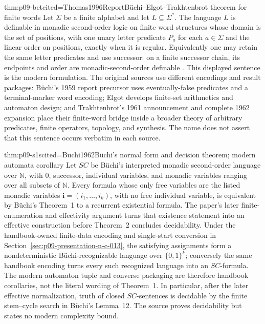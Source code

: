 \begin{hbtheorem}{thm:p09-bet}{cited=Thomas1996Report}{B\"uchi--Elgot--Trakhtenbrot theorem for finite words}
Let \(\Sigma\) be a finite alphabet and let \(L\subseteq\Sigma^*\).  The
language \(L\) is definable in monadic second-order logic on finite word
structures whose domain is the set of positions, with one unary letter
predicate \(P_a\) for each \(a\in\Sigma\) and the linear order on positions,
exactly when it is regular.  Equivalently one may retain the same letter
predicates and use successor: on a finite successor chain, its endpoints and
order are monadic-second-order definable
\cite{Buchi1959WeakReport,Buchi1960,Elgot1961,Trakhtenbrot1961,
Trakhtenbrot1962Expanded,Thomas1996Report}.
This displayed sentence is the modern formulation.  The original sources use
different encodings and result packages: B\"uchi's 1959 report
precursor uses eventually-false predicates and a terminal-marker word
encoding; Elgot develops finite-set arithmetics and automaton design; and
Trakhtenbrot's 1961 announcement and complete 1962 expansion place their
finite-word bridge inside a broader theory of arbitrary predicates, finite
operators, topology, and synthesis.  The name does not assert that this
sentence occurs verbatim in each source.
\end{hbtheorem}

\begin{hbtheorem}{thm:p09-s1s}{cited=Buchi1962}{B\"uchi's normal form and decision theorem; modern automata corollary}
Let \(SC\) be B\"uchi's interpreted monadic second-order language over
\(\mathbb N\), with \(0\), successor, individual variables, and monadic
variables ranging over all subsets of \(\mathbb N\).  Every formula whose only
free variables are the listed monadic variables
\(\mathbf i=(i_1,\ldots,i_k)\), with no free individual variable, is
equivalent by B\"uchi's Theorem~1 to a recurrent existential formula.  The
paper's later finite-enumeration and effectivity argument turns that existence
statement into an effective construction before Theorem~2 concludes
decidability.  Under the handbook-owned finite-data encoding and single-start
conversion in Section~\ref{sec:p09-presentation-n-c-013}, the satisfying
assignments form a nondeterministic B\"uchi-recognizable language over
\(\{0,1\}^k\); conversely the same handbook encoding turns every such
recognized language into an \(SC\)-formula.  The modern automaton tuple and
converse packaging are therefore handbook corollaries, not the literal wording
of Theorem~1.  In particular, after the later effective normalization, truth
of closed \(SC\)-sentences is decidable by the finite stem--cycle search in
B\"uchi's Lemma~12.  The source proves decidability but states no modern
complexity bound.
\end{hbtheorem}

